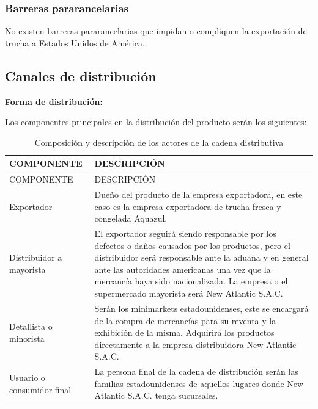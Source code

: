 \documentclass[
  stu,
  floatsintext,
  longtable,
  a4paper,
  nolmodern,
  notxfonts,
  notimes,
  12pt,
  colorlinks=true,linkcolor=blue,citecolor=blue,urlcolor=blue]{apa7}
\begin{document}
\subsubsection{Barreras pararancelarias}\label{barreras-pararancelarias}

No existen barreras pararancelarias que impidan o compliquen la
exportación de trucha a Estados Unidos de América.

\subsection{Canales de distribución}\label{canales-de-distribuciuxf3n}

\textbf{Forma de distribución:}

Los componentes principales en la distribución del producto serán los
siguientes:

\begin{longtable}[]{@{}
  >{\raggedright\arraybackslash}p{}
  >{\raggedright\arraybackslash}p{}@{}}
\caption{Composición y descripción de los actores de la cadena
distributiva}\tabularnewline
\toprule\noalign{}
\begin{minipage}[b]{\linewidth}\raggedright
COMPONENTE
\end{minipage} & \begin{minipage}[b]{\linewidth}\raggedright
DESCRIPCIÓN
\end{minipage} \\
\midrule\noalign{}
\endfirsthead
\toprule\noalign{}
\begin{minipage}[b]{\linewidth}\raggedright
COMPONENTE
\end{minipage} & \begin{minipage}[b]{\linewidth}\raggedright
DESCRIPCIÓN
\end{minipage} \\
\midrule\noalign{}
\endhead
\bottomrule\noalign{}
\endlastfoot
Exportador & Dueño del producto de la empresa exportadora, en este caso
es la empresa exportadora de trucha fresca y congelada Aquazul. \\
Distribuidor a mayorista & El exportador seguirá siendo responsable por
los defectos o daños causados por los productos, pero el distribuidor
será responsable ante la aduana y en general ante las autoridades
americanas una vez que la mercancía haya sido nacionalizada. La empresa
o el supermercado mayorista será New Atlantic S.A.C. \\
Detallista o minorista & Serán los minimarkets estadounidenses, este se
encargará de la compra de mercancías para su reventa y la exhibición de
la misma. Adquirirá los productos directamente a la empresa
distribuidora New Atlantic S.A.C. \\
Usuario o consumidor final & La persona final de la cadena de
distribución serán las familias estadounidenses de aquellos lugares
donde New Atlantic S.A.C. tenga sucursales. \\
\end{longtable}
\end{document}
